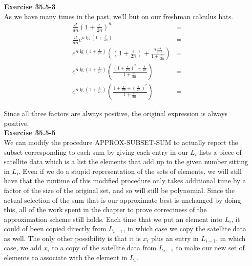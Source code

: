\documentclass{article}
\begin{document}
\noindent\textbf{Exercise 35.5-3}\\

As we have many times in the past, we'll but on our freshman calculus hats. 
\begin{align*}
\frac{d}{dn} \left( 1+ \frac{\epsilon}{2n}\right)^n&=\\
\frac{d}{dn} e^{n\lg\left( 1+ \frac{\epsilon}{2n}\right)}&=\\
e^{n\lg\left( 1+ \frac{\epsilon}{2n}\right)}\left(\left( 1+ \frac{\epsilon}{2n}\right) + \frac{n\frac{-\epsilon}{2n^2}}{1 + \frac{\epsilon}{2n}}\right)&=\\
e^{n\lg\left( 1+ \frac{\epsilon}{2n}\right)}\left(\frac{\left( 1+ \frac{\epsilon}{2n}\right)^2  - \frac{\epsilon}{2n}}{1 + \frac{\epsilon}{2n}}\right)&=\\
e^{n\lg\left( 1+ \frac{\epsilon}{2n}\right)}\left(\frac{ 1+ \frac{\epsilon}{2n}+ \left(\frac{\epsilon}{2n}\right)^2  }{1 + \frac{\epsilon}{2n}}\right)&=\end{align*}

Since all three factors are always positive, the original expression is always positive.\\



\noindent\textbf{Exercise 35.5-5}\\

We can modify the procedure APPROX-SUBSET-SUM to actually report the subset corresponding to each sum by giving each entry in our $L_i$ lists a piece of satellite data which is a list the elements that add up to the given number sitting in $L_i$. Even if we do a stupid representation of the sets of elements, we will still have that the runtime of this modified procedure only takes additional time by a factor of the size of the original set, and so will still be polynomial. Since the actual selection of the sum that is our approximate best is unchanged by doing this, all of the work spent in the chapter to prove correctness of the approximation scheme still holds. Each time that we put an element into $L_i$, it could of been copied directly from $L_{i-1}$, in which case we copy the satellite data as well. The only other possibility is that it is $x_i$ plus an entry in $L_{i-1}$, in which case, we add $x_i$ to a copy of the satellite data from $L_{i-1}$ to make our new set of elements to associate with the element in $L_i$.\\
\end{document}
